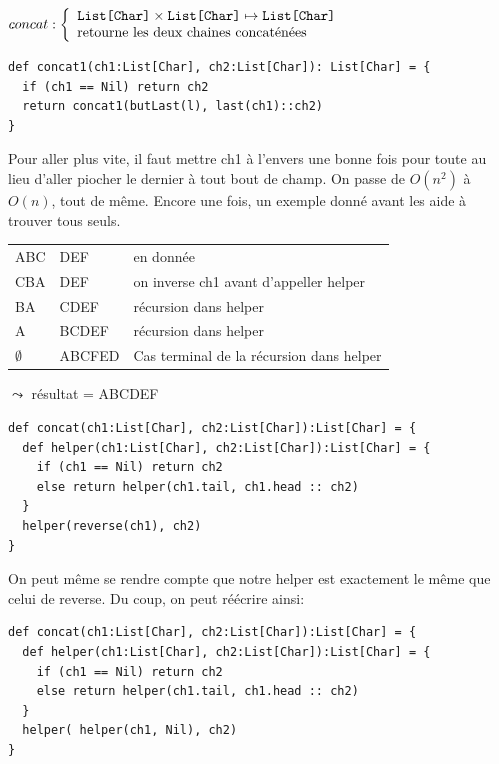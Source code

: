 \documentclass[10pt]{article}\usepackage[correction,nu]{esial}
\begin{document}
\begin{Question}
  $concat: \left\{
    \begin{array}{l}
      \text{\texttt{List[Char]}}\times \text{\texttt{List[Char]}}\mapsto \text{\texttt{List[Char]}}\\
      \text{retourne les deux chaines concaténées}
    \end{array}\right.$  
\end{Question}
\begin{Reponse}
  \begin{Verbatim}[label=version brutale: $O(n^2)$]
def concat1(ch1:List[Char], ch2:List[Char]): List[Char] = {
  if (ch1 == Nil) return ch2
  return concat1(butLast(l), last(ch1)::ch2)
}
  \end{Verbatim}

  Pour aller plus vite, il faut mettre ch1 à l'envers une bonne fois pour toute
  au lieu d'aller piocher le dernier à tout bout de champ. On passe de
  $O(n^2)$ à $O(n)$, tout de même. Encore une fois, un exemple donné avant les
  aide à trouver tous seuls.
  \medskip

  \begin{tabular}{|l l l|}\hline
    ABC&DEF& en donnée\\
    CBA&DEF& on inverse ch1 avant d'appeller helper\\
    BA&CDEF& récursion dans helper\\
    A&BCDEF& récursion dans helper\\
    $\emptyset$&ABCFED& Cas terminal de la récursion dans helper\\\hline
  \end{tabular}$\leadsto$ résultat = ABCDEF

  \begin{Verbatim}[label=version avec helper: $O(n)$]
def concat(ch1:List[Char], ch2:List[Char]):List[Char] = {
  def helper(ch1:List[Char], ch2:List[Char]):List[Char] = {
    if (ch1 == Nil) return ch2
    else return helper(ch1.tail, ch1.head :: ch2)
  }
  helper(reverse(ch1), ch2)
}
  \end{Verbatim}
  
  On peut même se rendre compte que notre helper est exactement le
  même que celui de reverse. Du coup, on peut réécrire ainsi:
  
  \begin{Verbatim}[label=version avec helper: $O(n)$]
def concat(ch1:List[Char], ch2:List[Char]):List[Char] = {
  def helper(ch1:List[Char], ch2:List[Char]):List[Char] = {
    if (ch1 == Nil) return ch2
    else return helper(ch1.tail, ch1.head :: ch2)
  }
  helper( helper(ch1, Nil), ch2)
}
  \end{Verbatim}
\end{Reponse}
\end{document}
